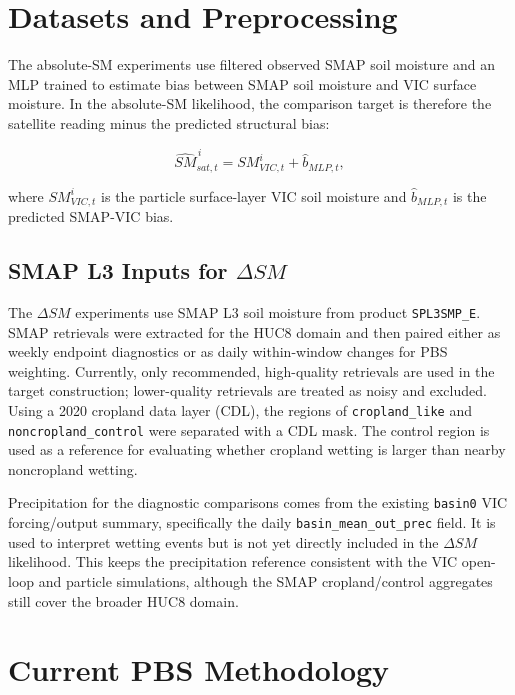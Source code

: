 \documentclass[11pt]{article}
\newcommand{\code}[1]{\texttt{#1}}
\begin{document}
\section{Datasets and Preprocessing}

The absolute-SM experiments use filtered observed SMAP soil moisture and an MLP trained to estimate bias between SMAP soil moisture and VIC surface moisture. In the absolute-SM likelihood, the comparison target is therefore the satellite reading minus the predicted structural bias: 

\begin{equation}
\widehat{SM}^{\,i}_{sat,t} = SM^{i}_{VIC,t} + \widehat{b}_{MLP,t},
\label{eq:mlp_bias}
\end{equation}

where $SM^{i}_{VIC,t}$ is the particle surface-layer VIC soil moisture and $\widehat{b}_{MLP,t}$ is the predicted SMAP-VIC bias.

\subsection{SMAP L3 Inputs for \texorpdfstring{$\Delta SM$}{Delta SM}}

The $\Delta SM$ experiments use SMAP L3 soil moisture from product \code{SPL3SMP\_E}. SMAP retrievals were extracted for the HUC8 domain and then paired either as weekly endpoint diagnostics or as daily within-window changes for PBS weighting. Currently, only recommended, high-quality retrievals are used in the target construction; lower-quality retrievals are treated as noisy and excluded. Using a 2020 cropland data layer (CDL), the regions of \code{cropland\_like} and \code{noncropland\_control} were separated with a CDL mask. The control region is used as a reference for evaluating whether cropland wetting is larger than nearby noncropland wetting.

Precipitation for the diagnostic comparisons comes from the existing \code{basin0} VIC forcing/output summary, specifically the daily \code{basin\_mean\_out\_prec} field. It is used to interpret wetting events but is not yet directly included in the $\Delta SM$ likelihood. This keeps the precipitation reference consistent with the VIC open-loop and particle simulations, although the SMAP cropland/control aggregates still cover the broader HUC8 domain.

\section{Current PBS Methodology}
\end{document}
